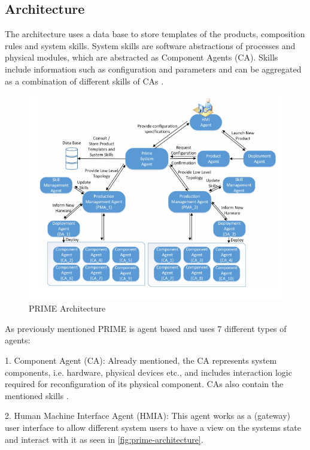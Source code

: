 \documentclass[conference,compsoc,hidelinks]{IEEEtran}
\begin{document}
\subsection{Architecture}
The architecture uses a data base to store templates of the products, composition rules and system skills. System skills are software abstractions of processes and physical modules, which are abstracted as Component Agents (CA). Skills include information such as configuration and parameters and can be aggregated as a combination of different skills of CAs \cite{Hybrid}.

\begin{figure}[ht]
	\includegraphics[width=\columnwidth]{img/PRIME-Architecture.png}
	\caption{PRIME Architecture \cite{Hybrid}}
	\label{fig:prime-architecture}
\end{figure}
\noindent
As previously mentioned PRIME is agent based and uses 7 different types of agents:

1. Component Agent (CA): Already mentioned, the CA represents system components, i.e. hardware, physical devices etc., and includes interaction logic required for reconfiguration of its physical component. CAs also contain the mentioned skills \cite{Hybrid}.

2. Human Machine Interface Agent (HMIA): This agent works as a (gateway) user interface to allow different system users to have a view on the systems state and interact with it as seen in \autoref{fig:prime-architecture}.
\end{document}

